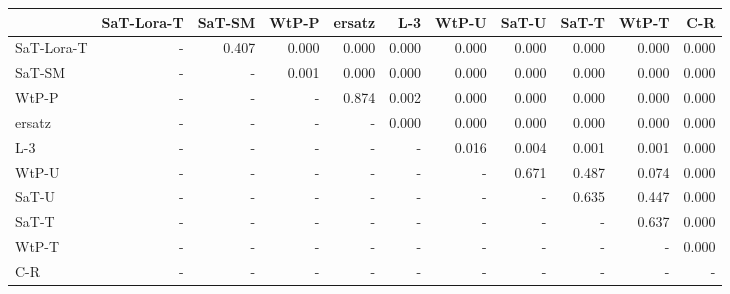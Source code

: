\begin{tabular}{lrrrrrrrrrr}
\toprule
 & SaT-Lora-T & SaT-SM & WtP-P & ersatz & L-3 & WtP-U & SaT-U & SaT-T & WtP-T & C-R \\
\midrule
SaT-Lora-T & - & 0.407 & 0.000 & 0.000 & 0.000 & 0.000 & 0.000 & 0.000 & 0.000 & 0.000 \\
SaT-SM & - & - & 0.001 & 0.000 & 0.000 & 0.000 & 0.000 & 0.000 & 0.000 & 0.000 \\
WtP-P & - & - & - & 0.874 & 0.002 & 0.000 & 0.000 & 0.000 & 0.000 & 0.000 \\
ersatz & - & - & - & - & 0.000 & 0.000 & 0.000 & 0.000 & 0.000 & 0.000 \\
L-3 & - & - & - & - & - & 0.016 & 0.004 & 0.001 & 0.001 & 0.000 \\
WtP-U & - & - & - & - & - & - & 0.671 & 0.487 & 0.074 & 0.000 \\
SaT-U & - & - & - & - & - & - & - & 0.635 & 0.447 & 0.000 \\
SaT-T & - & - & - & - & - & - & - & - & 0.637 & 0.000 \\
WtP-T & - & - & - & - & - & - & - & - & - & 0.000 \\
C-R & - & - & - & - & - & - & - & - & - & - \\
\bottomrule
\end{tabular}

